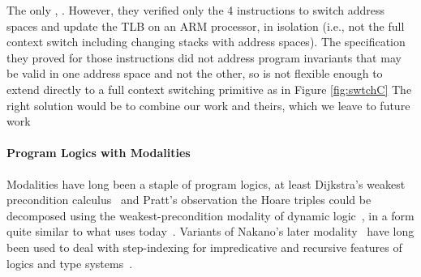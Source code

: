 The only 
\citet{syeda2018program,syeda2020formal},
.
However, they verified only the 4 instructions to switch address spaces and update the TLB on an ARM processor, in isolation
(i.e., not the full context switch including changing stacks with address spaces).
The specification they proved for those instructions did not address program invariants that may be valid in one address space and not the other,
so is not flexible enough to extend directly to a full context switching primitive as in Figure \ref{fig:swtchC}
The right  solution would be to combine our work
and  theirs,  which we leave to future work

\paragraph{Program Logics with Modalities}
Modalities have long been a staple of program logics, at least  Dijkstra's weakest precondition calculus~\cite{dijkstra1975guarded}
and Pratt's observation the Hoare triples
could be decomposed using the weakest-precondition modality of dynamic logic~\cite{pratt1976semantical},
in a form quite similar to what \iris uses today~\cite{jung2018iris}.
Variants of Nakano's later modality~\cite{nakano2000modality} have long been used to deal with step-indexing 
for impredicative and recursive features of logics and type systems~\cite{Appel2007,hobor2010theory,birkedal2011step,birkedal2013intensional,jung2018iris}.

